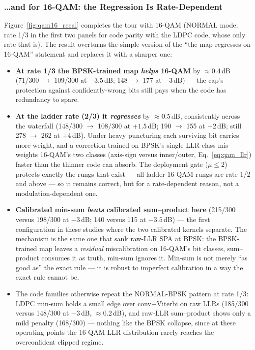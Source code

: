 \subsubsection{\ldots{}and for 16-QAM: the Regression Is
Rate-Dependent}

Figure~\ref{fig:qam16_recal} completes the tour with 16-QAM (NORMAL
mode; rate 1/3 in the first two panels for code parity with the LDPC
code, whose only rate that is).  The result overturns the simple
version of the ``the map regresses on 16-QAM'' statement and replaces
it with a sharper one:

\begin{itemize}
    \item \textbf{At rate 1/3 the BPSK-trained map \emph{helps}
          16-QAM} by $\approx$0.4\,dB (71/300 $\rightarrow$ 109/300 at
          $-3.5$\,dB; 148 $\rightarrow$ 177 at $-3$\,dB) --- the cap's
          protection against confidently-wrong bits still pays when
          the code has redundancy to spare.
    \item \textbf{At the ladder rate (2/3) it \emph{regresses}} by
          $\approx$0.5\,dB, consistently across the waterfall
          (148/300 $\rightarrow$ 108/300 at $+1.5$\,dB; 190
          $\rightarrow$ 155 at $+2$\,dB; still 278 $\rightarrow$ 262
          at $+4$\,dB).  Under heavy puncturing each surviving bit
          carries more weight, and a correction trained on BPSK's
          single LLR class mis-weights 16-QAM's two classes (axis-sign
          versus inner/outer, Eq.~\eqref{eq:qam_llr}) faster than the
          thinner code can absorb.  The deployment gate
          ($\mu \le 2$) protects exactly the rungs that exist --- all
          ladder 16-QAM rungs are rate 1/2 and above --- so it
          remains correct, but for a rate-dependent reason, not a
          modulation-dependent one.
    \item \textbf{Calibrated min-sum \emph{beats} calibrated
          sum--product here} (215/300 versus 198/300 at $-3$\,dB;
          140 versus 115 at $-3.5$\,dB) --- the first configuration
          in these studies where the two calibrated kernels separate.
          The mechanism is the same one that sank raw-LLR SPA at
          BPSK: the BPSK-trained map leaves a \emph{residual}
          miscalibration on 16-QAM's bit classes, sum--product
          consumes it as truth, min-sum ignores it.  Min-sum is not
          merely ``as good as'' the exact rule --- it is robust to
          imperfect calibration in a way the exact rule cannot be.
    \item The code families otherwise repeat the NORMAL-BPSK pattern
          at rate 1/3: LDPC min-sum holds a small edge over
          conv+Viterbi on raw LLRs (185/300 versus 148/300 at
          $-3$\,dB, $\approx$0.2\,dB), and raw-LLR sum--product shows
          only a mild penalty (168/300) --- nothing like the BPSK
          collapse, since at these operating points the 16-QAM LLR
          distribution rarely reaches the overconfident clipped
          regime.
\end{itemize}

